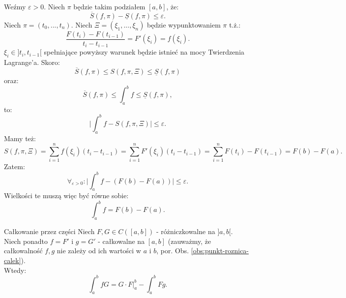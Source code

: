 \documentclass{article}
\numberwithin{defi}{section}
\numberwithin{defi}{section}
\newcommand{\Sd}{\underline{S}}
\newcommand{\Sg}{\overline{S}}
\providecommand{\eps}{\varepsilon}
\renewcommand{\leq}{\leqslant}
\begin{document}
\begin{dow}{}
    Weźmy $\eps > 0$. Niech $\pi$ będzie takim podziałem $[a, b]$, że: \begin{equation}
        \Sg(f, \pi) - \Sd(f, \pi) \leq \eps.
    \end{equation} Niech $\pi = (t_0, ..., t_n)$. Niech $\Xi = (\xi_1, ..., \xi_n)$ będzie wypunktowaniem $\pi$ t.ż.:\begin{equation}
        \frac{F(t_i) - F(t_{i - 1})}{ t_i - t_{i -1} } = F'(\xi_i) = f(\xi_i).
    \end{equation} $\xi_i \in ]t_i, t_{i-1}[$ spełniające powyższy warunek będzie istnieć na mocy Twierdzenia Lagrange'a. Skoro: \begin{equation}
        \Sg(f, \pi) \leq S(f, \pi, \Xi) \leq \Sd(f, \pi)
    \end{equation} oraz: \begin{equation}
        \Sg(f, \pi) \leq \int_{a}^{b} f \leq \Sd(f, \pi),
    \end{equation} to: \begin{equation}
        \big| \int_{a}^{b} f - S(f, \pi, \Xi) \big| \leq \eps.
    \end{equation} Mamy też: \begin{equation}
        S(f, \pi, \Xi) = \sum_{i = 1}^{n} f(\xi_i) ( t_i - t_{i -1}) = \sum_{i = 1}^{n} F'(\xi_i) ( t_i - t_{i -1}) =  \sum_{i = 1}^{n} F(t_i) - F(t_{i - 1}) = F(b) - F(a).
    \end{equation} Zatem: \begin{equation}
        \forall_{\eps > 0}: \big| \int_{a}^{b} f - (F(b) - F(a)) \big| \leq \eps.
    \end{equation} Wielkości te muszą więc być równe sobie: \begin{equation}
        \int_{a}^{b} f  = F(b) - F(a).
    \end{equation}
\end{dow}

\begin{twier}{Całkowanie przez części}
    Niech $F,G \in C([a, b])$ - różniczkowalne na $]a, b[$. Niech ponadto $f = F'$ i $g = G'$ - całkowalne na $[a, b]$ (zauważmy, że całkowalność $f, g$ nie zależy od ich wartości w $a$ i $b$, por. Obs. \ref*{obs:punkt-roznica-calek}). \\
    Wtedy: \begin{equation}
        \int_{a}^{b} f G = G \cdot F \big|_{a}^{b} - \int_{a}^{b} F g.
    \end{equation}
\end{twier}
\end{document}
